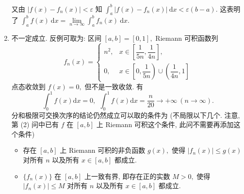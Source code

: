 \begin{solution}
\begin{enumerate}
    又由 $\lvert f(x) - f_n(x) \rvert < \varepsilon$ 知 $\int_a^b \lvert f(x) - f_n(x) \rvert ~ \mathrm{d} x < \varepsilon (b - a).$ 这表明了 $\int_a^b f(x) ~ \mathrm{d} x = \lim\limits_{n\to\infty} \int_a^b f_n(x) ~ \mathrm{d} x.$
    \item 不一定成立. 反例可取为: 区间 $[a, b] = [0, 1],$ Riemann 可积函数列
    $$f_n(x) = \begin{cases}
    n^2, & x \in \left[ \dfrac{1}{5n}, \dfrac{1}{4n} \right], \\
    0, & x \in \left[0, \dfrac{1}{5n} \right) \cup \left(\dfrac{1}{4n}, 1 \right]
    \end{cases}$$
    点态收敛到 $f(x) = 0,$ 但不是一致收敛. 有
    $$\int_0^1 f(x) \mathrm{d} x = 0, ~~ \int_0^1 f(x) \mathrm{d} x = \dfrac{n}{20} \to +\infty ~ (n \to \infty).$$
    分和极限可交换次序的结论仍然成立可以取的条件为 (不局限以下几个. 注意, 第 (2) 问中已有 $f$ 在 $[a, b]$ 上 Riemann 可积这个条件, 此问不需要再添加这个条件)
    \begin{itemize}
      \item 存在 $[a, b]$ 上 Riemann 可积的非负函数 $g(x),$ 使得 $\lvert f_n(x) \rvert \leqslant g(x)$ 对所有 $n$ 以及所有 $x \in [a, b]$ 都成立.
      \item $\{f_n(x)\}$ 在 $[a, b]$ 上一致有界, 即存在正的实数 $M > 0,$ 使得 $\lvert f_n(x) \rvert \leqslant M$ 对所有 $n$ 以及所有 $x \in [a, b]$ 都成立.
    \end{itemize}
  \end{enumerate}
\end{solution}


